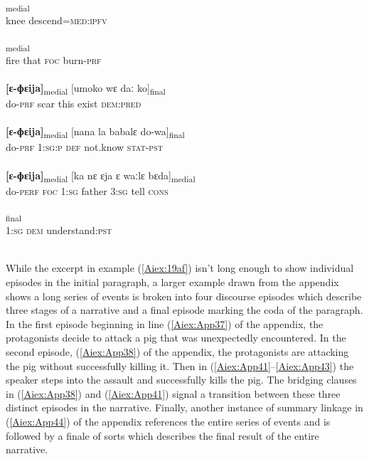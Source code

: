 \documentclass[output=paper]{LSP/langsci}
\begin{document}
	\begin{exe}
\ex \label{Aiex:19af}
\begin{xlist}
\ex \label{Aiex:19a}
\gll [gulu	tila=nɛgɛː]\textsubscript{medial}\\
knee	descend\textsc{=med:ipfv}\\
\glt {}\\
\ex \label{Aiex:19b}
\textsubscript{medial}\\
fire	that	\textsc{foc}	burn\textsc{-prf}\\
\glt {}\\
\ex \label{Aiex:19c}
\gll \textbf{[ɛ-ɸɛija]}\textsubscript{medial}	[umoko	wɛ	daː	ko]\textsubscript{final}\\
do\textsc{-prf}	scar	this	exist	\textsc{dem:pred}\\
\glt {}\\
\ex \label{Aiex:19d}
\gll \textbf{[ɛ-ɸɛija]}\textsubscript{medial}	[nana	la	babalɛ	do-wa]\textsubscript{final}\\
do\textsc{-prf}	\textsc{1:sg:p}	\textsc{def}	not.know	\textsc{stat-pst}\\
\glt {}\\
\ex \label{Aiex:19e}
\gll \textbf{[ɛ-ɸɛija]}\textsubscript{medial}	[ka	nɛ	ɛja	ɛ	waːlɛ	bɛda]\textsubscript{medial}\\
do-\textsc{perf}	\textsc{foc}	\textsc{1:sg}	father	\textsc{3:sg}	tell	\textsc{cons}\\
\glt {}\\
\ex \label{Aiex:19f}
\textsubscript{final}\\
\textsc{1:sg}	\textsc{dem}	understand\textsc{:pst}\\
\glt {}\\
\end{xlist}
\end{exe}

	While the excerpt in example (\ref{Aiex:19af}) isn’t long enough to show individual episodes in the initial paragraph, a larger example drawn from the appendix shows a long series of events is broken into four discourse episodes which describe three stages of a narrative and a final episode marking the coda of the paragraph. In the first episode beginning in line (\ref{Aiex:App37}) of the appendix, the protagonists decide to attack a pig that was unexpectedly encountered. In the second episode, (\ref{Aiex:App38}) of the appendix, the protagonists are attacking the pig without successfully killing it. Then in (\ref{Aiex:App41}--\ref{Aiex:App43}) the speaker steps into the assault and successfully kills the pig. The bridging clauses in (\ref{Aiex:App38}) and (\ref{Aiex:App41}) signal a transition between these three distinct episodes in the narrative. Finally, another instance of summary linkage in (\ref{Aiex:App44}) of the appendix references the entire series of events and is followed by a finale of sorts which describes the final result of the entire narrative.
	
\end{document}
